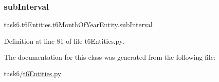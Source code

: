 \subsubsection{\texorpdfstring{sub\+Interval}{subInterval}}
{\footnotesize\ttfamily task6.\+t6\+Entities.\+t6\+Month\+Of\+Year\+Entity.\+sub\+Interval}



Definition at line 81 of file t6\+Entities.\+py.



The documentation for this class was generated from the following file\+:\begin{DoxyCompactItemize}
\item 
task6/\hyperlink{t6Entities_8py}{t6\+Entities.\+py}\end{DoxyCompactItemize}
